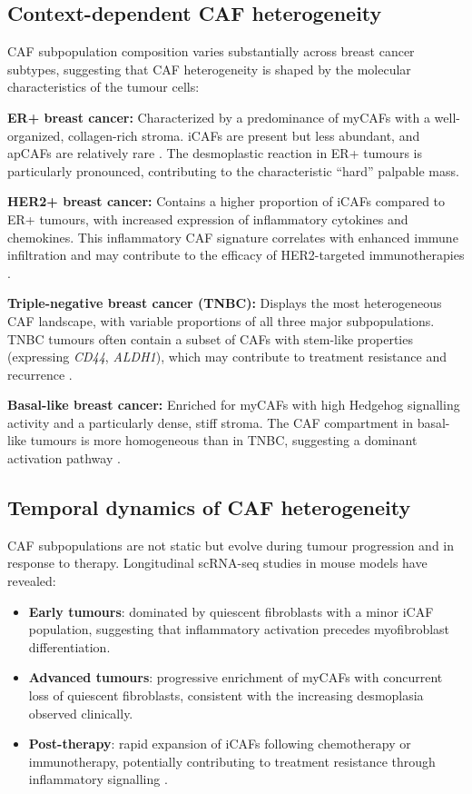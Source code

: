 \subsection{Context-dependent CAF heterogeneity}

CAF subpopulation composition varies substantially across breast cancer subtypes, suggesting that CAF heterogeneity is shaped by the molecular characteristics of the tumour cells:

\textbf{ER+ breast cancer:} Characterized by a predominance of myCAFs with a well-organized, collagen-rich stroma. iCAFs are present but less abundant, and apCAFs are relatively rare \citep{wu2020single}. The desmoplastic reaction in ER+ tumours is particularly pronounced, contributing to the characteristic ``hard'' palpable mass.

\textbf{HER2+ breast cancer:} Contains a higher proportion of iCAFs compared to ER+ tumours, with increased expression of inflammatory cytokines and chemokines. This inflammatory CAF signature correlates with enhanced immune infiltration and may contribute to the efficacy of HER2-targeted immunotherapies \citep{liu2019}.

\textbf{Triple-negative breast cancer (TNBC):} Displays the most heterogeneous CAF landscape, with variable proportions of all three major subpopulations. TNBC tumours often contain a subset of CAFs with stem-like properties (expressing \textit{CD44}, \textit{ALDH1}), which may contribute to treatment resistance and recurrence \citep{peer2021}.

\textbf{Basal-like breast cancer:} Enriched for myCAFs with high Hedgehog signalling activity and a particularly dense, stiff stroma. The CAF compartment in basal-like tumours is more homogeneous than in TNBC, suggesting a dominant activation pathway \citep{pein2020}.

\subsection{Temporal dynamics of CAF heterogeneity}

CAF subpopulations are not static but evolve during tumour progression and in response to therapy. Longitudinal scRNA-seq studies in mouse models have revealed:

\begin{itemize}
  \item \textbf{Early tumours}: dominated by quiescent fibroblasts with a minor iCAF population, suggesting that inflammatory activation precedes myofibroblast differentiation.
  \item \textbf{Advanced tumours}: progressive enrichment of myCAFs with concurrent loss of quiescent fibroblasts, consistent with the increasing desmoplasia observed clinically.
  \item \textbf{Post-therapy}: rapid expansion of iCAFs following chemotherapy or immunotherapy, potentially contributing to treatment resistance through inflammatory signalling \citep{peer2021}.
\end{itemize}

